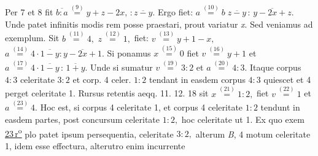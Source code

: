 Per 7 et 8 fit
$\overline{b : a} \overset{(9)}{=} y + z - 2x,\, : \overline{z - y}.$
Ergo fiet:
$a\overset{(10)}{=} b\; \overline{z - y}\, :\, \overline{y - 2x + z}.$
Unde patet infinitis modis rem posse praestari,
prout variatur \textit{x}. %
Sed veniamus ad exemplum.%
\pend%
\pstart
Sit
$b \overset{(11)}{=} 4,$
$z \overset{(12)}{=} 1,$
fiet:
$v \overset{(13)}{=} y + 1 - x,$
$a \overset{(14)}{=} 4 \cdot \overline{1 - y} : \overline{y - 2x + 1}.$
Si ponamus
$x \overset{(15)}{=} 0$
fiet
$v \overset{(16)}{=} y + 1$
et
$a \overset{(17)}{=} 4 \cdot \overline{1 - y}\, :\, \overline{ 1 + y}.$
Unde si sumatur
$v \overset{(19)}{=} 3 : 2$
et
$a \overset{(20)}{=} 4 : 3.$
Itaque corpus $4 : 3$
celeritate $3 : 2$
et corp. 4
celer. $1 : 2$
tendant in easdem%
%
corpus $4 : 3$ quiescet%
et 4 perget celeritate 1.%
Rursus retentis aeqq. 11. 12. 18%
sit
$x \overset{(21)}{=} 1 : 2,$
fiet
$v \overset{(22)}{=} 1$
et
$a\overset{(23)}{=}4.$
Hoc est,
si corpus 4 celeritate 1,
et corpus 4 celeritate $1 : 2$
tendunt in easdem partes,
post concursum%
%
celeritate $1 : 2,$
hoc celeritate ut 1.
\pend%
\pstart%
Ex quo exem%
\lbrack%
\href{\Scan{LH_35_09_07_023r}}{23\,r\textsuperscript{o}}%
\rbrack%
plo patet%
ipsum persequentia,%
celeritate $3 : 2,$
alterum \textit{B}, 4
motum celeritate 1,%
idem esse effectura,%
alterutro enim incurrente%
